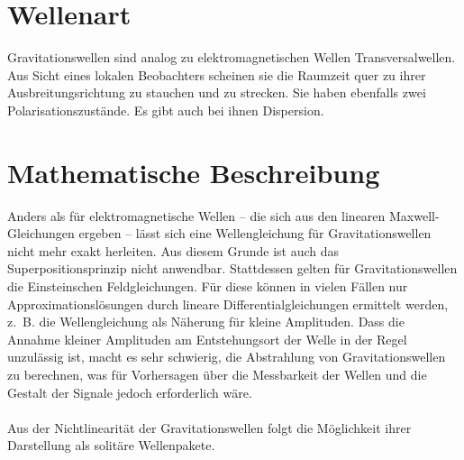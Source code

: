 \section{Wellenart}
Gravitationswellen sind analog zu elektromagnetischen Wellen Transversalwellen. Aus Sicht eines lokalen Beobachters scheinen sie die Raumzeit quer zu ihrer Ausbreitungsrichtung zu stauchen und zu strecken. Sie haben ebenfalls zwei Polarisationszustände. Es gibt auch bei ihnen Dispersion.

\section{Mathematische Beschreibung}
Anders als für elektromagnetische Wellen – die sich aus den linearen Maxwell-Gleichungen ergeben – lässt sich eine Wellengleichung für Gravitationswellen nicht mehr exakt herleiten. Aus diesem Grunde ist auch das Superpositionsprinzip nicht anwendbar. Stattdessen gelten für Gravitationswellen die Einsteinschen Feldgleichungen. Für diese können in vielen Fällen nur Approximationslösungen durch lineare Differentialgleichungen ermittelt werden, z. B. die Wellengleichung als Näherung für kleine Amplituden. Dass die Annahme kleiner Amplituden am Entstehungsort der Welle in der Regel unzulässig ist, macht es sehr schwierig, die Abstrahlung von Gravitationswellen zu berechnen, was für Vorhersagen über die Messbarkeit der Wellen und die Gestalt der Signale jedoch erforderlich wäre. \\ \\
Aus der Nichtlinearität der Gravitationswellen folgt die Möglichkeit ihrer Darstellung als solitäre Wellenpakete.



